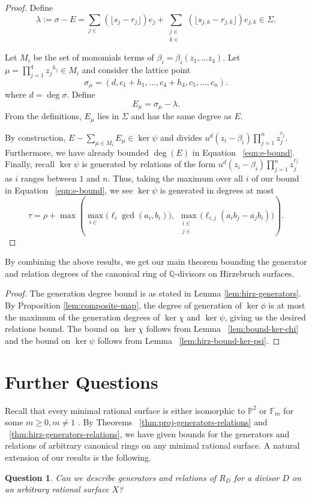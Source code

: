 \documentclass{amsart}
\theoremstyle{plain}
\newtheorem{question}[thm]{Question}
\theoremstyle{definition}
\theoremstyle{remark}
\numberwithin{equation}{section}
\newcommand\bq{{\mathbb Q}}
\newcommand\bp{{\mathbb P}}
\newcommand\bida{a}
\newcommand\bidb{b}
\newcommand\hirz{\mathbb{F}}
\DeclareMathOperator{\Te}{T_=}
\DeclareMathOperator{\Tp}{T_+}
\DeclareMathOperator{\Tm}{T_-}
\begin{document}
\begin{proof}
Define
\[
	\lambda := \sigma - E = \sum_{j \in \Te} (\lfloor s_j - r_j \rfloor)
	e_j + \sum_{\substack{j \in \Tp \\ k \in \Tm}} ( \lfloor s_{j, k} -
	r_{j, k} \rfloor) e_{j, k} \in \Sigma.
\]

\noindent
Let $M_i$ be the set of monomials terms of $\beta_i = \beta_i(z_1, \ldots z_4)$.  Let $\mu = \prod_{j=1}^4
{z_j}^{h_j}\in M_i$ and consider the lattice point 
\[
	\sigma_\mu = (d, c_1 + h_1, \ldots, c_4+h_4, c_5, \ldots, c_n).
\]
where $d = \deg \sigma$.
Define 
\[
	E_\mu = \sigma_\mu - \lambda.
\]
From the definitions, $E_\mu$ lies in $\Sigma$ 
and has the same degree as $E$.

By construction, $E - \sum_{\mu \in M_i} E_\mu \in \ker \psi$ and
divides $u^d(z_i - \beta_i) \prod_{j = 1}^n z_j^{c_j}$. 
Furthermore, we have already bounded $\deg(E)$ in Equation ~\eqref{eqn:e-bound}.
Finally, recall $\ker \psi$ is generated by relations of the form $u^d(z_i - \beta_i) \prod_{j = 1}^n z_j^{c_j}$ as
$i$ ranges between $1$ and $n$. Thus, taking the maximum over all $i$ 
of our bound in Equation ~\eqref{eqn:e-bound}, we see $\ker \psi$ is generated in degrees at most
\[
	\tau = \rho
	+ \max \left(\max_{i\in \Te} \bigl(\ell_i \gcd(a_i, b_i) \bigr),
	\; \max_{\substack{i \in \Tp \\ j \in \Tm}} \bigl(\ell_{i, j}
	(\bida_i \bidb_j - \bida_j
	\bidb_i) \bigr) \right).
\]
\end{proof}

By combining the above results, we get our main theorem bounding
the generator and relation degrees of the canonical ring of
$\bq$-divisors on Hirzebruch surfaces.

\hirzrestate*

\begin{proof}
The generation degree bound is as stated in Lemma \ref{lem:hirz-generators}.
By Proposition \ref{lem:composite-map}, the degree of generation of
$\ker \phi$ is at most the maximum of the generation degrees of $\ker \chi$
and $\ker \psi$, giving us the desired relations bound. The bound on $\ker \chi$
follows from Lemma ~\ref{lem:bound-ker-chi} and the bound on $\ker \psi$
follows from Lemma ~\ref{lem:hirz-bound-ker-psi}.
\end{proof}


\section{Further Questions}
\label{sec:conc}
Recall that every minimal rational surface is either isomorphic to
$\bp^2$ or $\hirz_m$ for some $m \geq 0, m \neq 1$ \cite{eisenbud-harris:minimal}. By Theorems
~\ref{thm:proj-generators-relations} and ~\ref{thm:hirz-generators-relations}, we have given bounds for the generators and relations
of arbitrary canonical rings on any minimal rational surface. A
natural extension of our results is the following.
\begin{question}
\label{qn:general-minimal-surface}
Can we describe generators and relations of $R_D$ for a divisor $D$ on an
arbitrary rational surface $X$?
\end{question}
\end{document}
